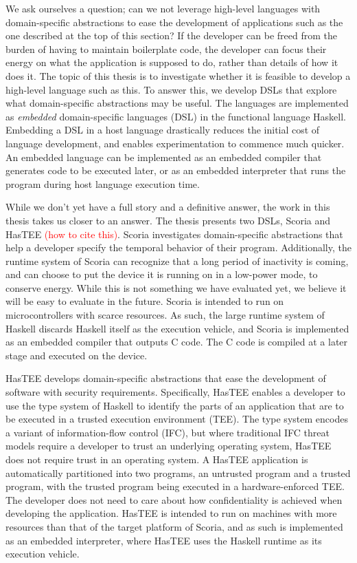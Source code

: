 We ask ourselves a question; can we not leverage high-level languages with domain-specific abstractions to ease the
development of applications such as the one described at the top of this section? If the developer can be freed from the burden
of having to maintain boilerplate code, the developer can focus their energy on what the application is supposed to do, rather than
details of how it does it.
The topic of this thesis is to investigate whether it is feasible to develop a high-level language such as this. To
answer this, we develop DSLs that explore what domain-specific abstractions may be useful. The languages are
implemented as \textit{embedded} domain-specific languages (DSL) in the functional language Haskell. Embedding a DSL in a host
language drastically reduces the initial cost of language development, and enables experimentation to commence much quicker. An
embedded language can be implemented as an embedded compiler that generates code to be executed later, or as an embedded
interpreter that runs the program during host language execution time.

While we don't yet have a full story and a definitive answer, the work in this thesis takes us closer to an answer.
The thesis presents two DSLs, Scoria and HasTEE \textcolor{red}{(how to cite this)}. Scoria investigates domain-specific
abstractions that help a developer specify the temporal behavior of their program. Additionally, the runtime system of Scoria can
recognize that a long period of inactivity is coming, and can choose to put the device it is running on in a low-power mode,
to conserve energy. While this is not something we have evaluated yet, we believe it will be easy to evaluate in the future.
Scoria is intended to run on microcontrollers with scarce resources. As such, the large runtime system of Haskell discards
Haskell itself as the execution vehicle, and Scoria is implemented as an embedded compiler that outputs C code. The C code
is compiled at a later stage and executed on the device.

HasTEE develops domain-specific abstractions that ease the development of software with security requirements. Specifically,
HasTEE enables a developer to use the type system of Haskell to identify the parts of an application that are to be executed in a
trusted execution environment (TEE). The type system encodes a variant of information-flow control (IFC), but where traditional
IFC threat models require a developer to trust an underlying operating system, HasTEE does not require trust in an operating system.
A HasTEE application is automatically partitioned into two programs, an untrusted program and a trusted program, with the trusted
program being executed in a hardware-enforced TEE. The developer does not need to care about how confidentiality
is achieved when developing the application. HasTEE is intended to run on machines with more resources than that of the target
platform of Scoria, and as such is implemented as an embedded interpreter, where HasTEE uses the Haskell runtime as its execution
vehicle.


